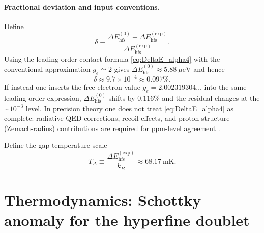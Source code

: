 \documentclass[11pt,a4paper]{article}
\begin{document}
    \paragraph{Fractional deviation and input conventions.}
        Define
        \[
            \delta \equiv \frac{\Delta E_{\mathrm{hfs}}^{(0)}-\Delta E_{\mathrm{hfs}}^{\mathrm{(exp)}}}{\Delta E_{\mathrm{hfs}}^{\mathrm{(exp)}}}.
        \]
        Using the leading-order contact formula \eqref{eq:DeltaE_alpha4} with the conventional approximation $g_e\simeq 2$
        gives $\Delta E_{\mathrm{hfs}}^{(0)}\approx 5.88~\mu\mathrm{eV}$ and hence
        \[
            \delta \approx 9.7\times 10^{-4}\approx 0.097\%.
        \]
        If instead one inserts the free-electron value $g_e=2.002319304\ldots$ into the same leading-order expression,
        $\Delta E_{\mathrm{hfs}}^{(0)}$ shifts by $0.116\%$ and the residual changes at the $\sim 10^{-3}$ level.
        In precision theory one does not treat \eqref{eq:DeltaE_alpha4} as complete: radiative QED corrections,
        recoil effects, and proton-structure (Zemach-radius) contributions are required for ppm-level agreement
        \cite{Karshenboim2002,BLP_QED1982}.
        
        Define the gap temperature scale
        \begin{equation}
            T_\Delta \equiv \frac{\Delta E_{\mathrm{hfs}}^{\mathrm{(exp)}}}{k_B}\approx 68.17~\mathrm{mK}.
            \label{eq:TDelta}
        \end{equation}

    \section{Thermodynamics: Schottky anomaly for the hyperfine doublet}
    \label{sec:schottky}
    
\end{document}

